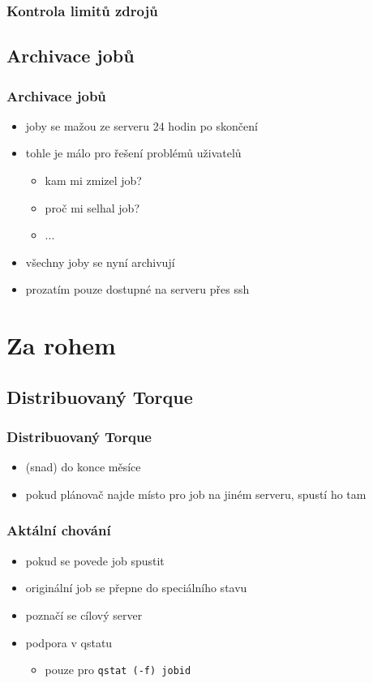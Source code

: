 \documentclass[pdftex,aspectratio=169]{beamer}
\begin{document}



\begin{frame}
	\frametitle{Kontrola limitů zdrojů}
\end{frame}

\subsection{Archivace jobů}

\begin{frame}
	\frametitle{Archivace jobů}
	\begin{itemize}
		\item{joby se mažou ze serveru 24 hodin po skončení}
		\item{tohle je málo pro řešení problémů uživatelů}
		\begin{itemize}
			\item{kam mi zmizel job?}
			\item{proč mi selhal job?}
			\item{...}
		\end{itemize}
		\item{všechny joby se nyní archivují}
		\item{prozatím pouze dostupné na serveru přes ssh}
	\end{itemize}
\end{frame}

\section{Za rohem}
\subsection{Distribuovaný Torque}

\begin{frame}
	\frametitle{Distribuovaný Torque}
	\begin{itemize}
		\item{(snad) do konce měsíce}
		\item{pokud plánovač najde místo pro job na jiném serveru, spustí ho tam}
	\end{itemize}
\end{frame}

\begin{frame}
	\frametitle{Aktální chování}
	\begin{itemize}
		\item{pokud se povede job spustit}
		\item{originální job se přepne do speciálního stavu}
		\item{poznačí se cílový server}
		\item{podpora v qstatu}
		\begin{itemize}
			\item{pouze pro \texttt{qstat (-f) jobid}}
		\end{itemize}
	\end{itemize}
\end{frame}
\end{document}
